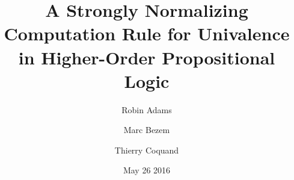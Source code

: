 \title{A Strongly Normalizing Computation Rule for Univalence in Higher-Order Propositional Logic}
\author{\alert{Robin Adams} \and Marc Bezem \and Thierry Coquand}
\date{May 26 2016}

\usepackage{amsmath}
\usepackage{amssymb}
\usepackage{bbm}
\usepackage[greek,english]{babel}
\usepackage{ucs}
\usepackage[utf8x]{inputenc}
\usepackage{autofe}
\usepackage{fancyvrb}
\usepackage{proof}
\usepackage{stmaryrd}

\DeclareUnicodeCharacter{10214}{\ensuremath{[}}
\DeclareUnicodeCharacter{10215}{\ensuremath{]}}


\usepackage{textalpha}


\newtheorem{prop}{Proposition}[section]

\newcommand{\Set}{\mathbf{Set}}
\newcommand{\eqdef}{\mathrel{\smash{\stackrel{\text{def}}{=}}}}
\newcommand{\AgdaHide}[1]{}
\newcommand{\isotoid}{\ensuremath{isotoid}}
\newcommand{\vald}{\ensuremath{\ \mathrm{valid}}}
\newcommand{\reff}[1]{\ensuremath{\mathsf{ref} \left( {#1} \right)}}
\newcommand{\univ}[4]{\ensuremath{\mathsf{univ}_{{#1} , {#2}} \left( {#3} , {#4} \right)}}
\newcommand{\triplelambda}{\lambda \!\! \lambda \!\! \lambda}



\begin{frame}
\maketitle



\end{frame}

